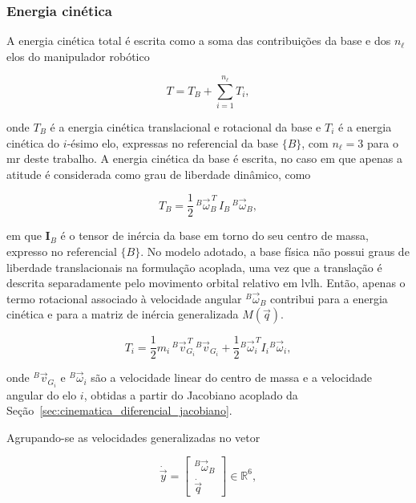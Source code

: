 \subsubsection{Energia cinética}
\label{sec:dinAcoplada_energia_cinetica}

A energia cinética total é escrita como a soma das contribuições da base e dos $n_\ell$ elos do manipulador robótico

\begin{equation}
T = T_{B} + \sum_{i=1}^{n_\ell} T_{i},
\label{eq:T_total}
\end{equation}

onde $T_B$ é a energia cinética translacional e rotacional da base e $T_i$ é a energia cinética do $i$-ésimo elo, expressas no referencial da base $\{B\}$, com $n_\ell = 3$ para o \gls{mr} deste trabalho.
A energia cinética da base é escrita, no caso em que apenas a atitude é considerada como grau de liberdade dinâmico, como

\begin{equation}
T_{B} =
\frac{1}{2}\, {}^{B}\!\vec\omega_{B}^{\,T}\, I_B\, {}^{B}\!\vec\omega_{B},
\label{eq:TB}
\end{equation}

em que $\mathbf{I}_B$ é o tensor de inércia da base em torno do seu centro de massa, expresso no referencial $\{B\}$.
No modelo adotado, a base física não possui graus de liberdade translacionais na formulação acoplada, uma vez que a translação é descrita separadamente pelo movimento orbital relativo em \gls{lvlh}.
Então, apenas o termo rotacional associado à velocidade angular ${}^{B}\!\vec\omega_B$ contribui para a energia cinética e para a matriz de inércia generalizada $M(\vec q)$.

\begin{equation}
T_i =
\frac{1}{2} m_i\, {}^{B}\!\vec v_{G_i}^{\,T} {}^{B}\!\vec v_{G_i}
+
\frac{1}{2} {}^{B}\!\vec\omega_i^{\,T} I_i {}^{B}\!\vec\omega_i,
\label{eq:Ti}
\end{equation}

onde ${}^{B}\!\vec v_{G_i}$ e ${}^{B}\!\vec\omega_i$ são a velocidade linear do centro de massa e a velocidade angular do elo $i$, obtidas a partir do Jacobiano acoplado da Seção~\ref{sec:cinematica_diferencial_jacobiano}.

Agrupando-se as velocidades generalizadas no vetor

\begin{equation}
\dot{\vec y}
=
\begin{bmatrix}
{}^{B}\!\vec\omega_{B} \\
\dot{\vec q}
\end{bmatrix}
\in \mathbb{R}^{6}, 
\end{equation}

